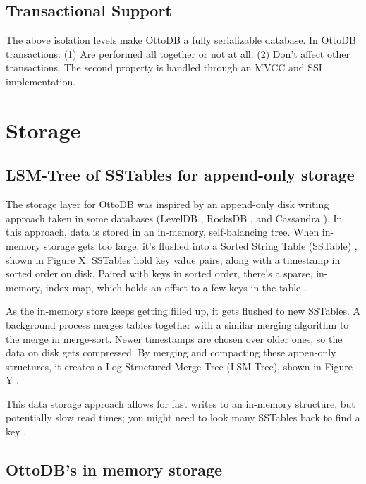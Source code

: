 \documentclass[conference]{IEEEtran}
\begin{document}
    \subsection{Transactional Support}

    The above isolation levels make OttoDB a fully serializable database. In OttoDB transactions: (1) Are performed all together or not at all. (2) Don’t affect other transactions. The second property is handled through an MVCC and SSI implementation. 

    \section{Storage}

    \subsection{LSM-Tree of SSTables for append-only storage}

    The storage layer for OttoDB was inspired by an append-only disk writing approach taken in some databases (LevelDB \cite{b7}, RocksDB \cite{b6}, and Cassandra \cite{b19}). In this approach, data is stored in an in-memory, self-balancing tree. When in-memory storage gets too large, it’s flushed into a Sorted String Table (SSTable) \cite[p. 78]{b18}, shown in Figure X. SSTables hold key value pairs, along with a timestamp in sorted order on disk. Paired with keys in sorted order, there’s a sparse, in-memory, index map, which holds an offset to a few keys in the table \cite[p. 77]{b18}. 


    As the in-memory store keeps getting filled up, it gets flushed to new SSTables. A background process merges tables together with a similar merging algorithm to the merge in merge-sort. Newer timestamps are chosen over older ones, so the data on disk gets compressed. By merging and compacting these appen-only structures, it creates a Log Structured Merge Tree (LSM-Tree), shown in Figure Y \cite[p. 78-79]{b18}. 


    This data storage approach allows for fast writes to an in-memory structure, but potentially slow read times; you might need to look many SSTables back to find a key \cite[p. 79]{b18}.

    \subsection{OttoDB’s in memory storage}
\end{document}

